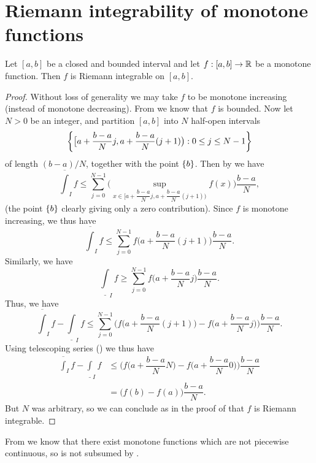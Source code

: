 \section{Riemann integrability of monotone functions}\label{i:sec:11.6}

\begin{prop}\label{i:11.6.1}
  Let \([a, b]\) be a closed and bounded interval and let \(f : [a, b] \to \mathbb{R}\) be a monotone function.
  Then \(f\) is Riemann integrable on \([a, b]\).
\end{prop}

\begin{proof}
  Without loss of generality we may take \(f\) to be monotone increasing (instead of monotone decreasing).
  From  we know that \(f\) is bounded.
  Now let \(N > 0\) be an integer, and partition \([a, b]\) into \(N\) half-open intervals
  \[
    \left\lbrace\big[a + \dfrac{b - a}{N} j, a + \dfrac{b - a}{N} (j + 1)\big) : 0 \leq j \leq N - 1\right\rbrace
  \]
  of length \((b - a) / N\), together with the point \(\left\lbrace b\right\rbrace\).
  Then by  we have
  \[
    \overline{\int}_I f \leq \sum_{j = 0}^{N - 1} \Bigg(\sup_{x \in \big[a + \dfrac{b - a}{N} j, a + \dfrac{b - a}{N} (j + 1)\big)} f(x)\Bigg) \dfrac{b - a}{N},
  \]
  (the point \(\left\lbrace b\right\rbrace\) clearly giving only a zero contribution).
  Since \(f\) is monotone increasing, we thus have
  \[
    \overline{\int}_I f \leq \sum_{j = 0}^{N - 1} f\bigg(a + \dfrac{b - a}{N} (j + 1)\bigg) \dfrac{b - a}{N}.
  \]
  Similarly, we have
  \[
    \underline{\int}_I f \geq \sum_{j = 0}^{N - 1} f\bigg(a + \dfrac{b - a}{N} j\bigg) \dfrac{b - a}{N}.
  \]
  Thus, we have
  \[
    \overline{\int}_I f - \underline{\int}_I f \leq \sum_{j = 0}^{N - 1} \Bigg(f\bigg(a + \dfrac{b - a}{N} (j + 1)\bigg) - f\bigg(a + \dfrac{b - a}{N} j\bigg)\Bigg) \dfrac{b - a}{N}.
  \]
  Using telescoping series () we thus have
  \begin{align*}
    \overline{\int}_I f - \underline{\int}_I f & \leq \Bigg(f\bigg(a + \dfrac{b - a}{N} N\bigg) - f\bigg(a + \dfrac{b - a}{N} 0\bigg)\Bigg) \dfrac{b - a}{N} \\
                                               & = \big(f(b) - f(a)\big) \dfrac{b - a}{N}.
  \end{align*}
  But \(N\) was arbitrary, so we can conclude as in the proof of  that \(f\) is Riemann integrable.
\end{proof}

\begin{rmk}\label{i:11.6.2}
  From  we know that there exist monotone functions which are not piecewise continuous, so  is not subsumed by .
\end{rmk}

